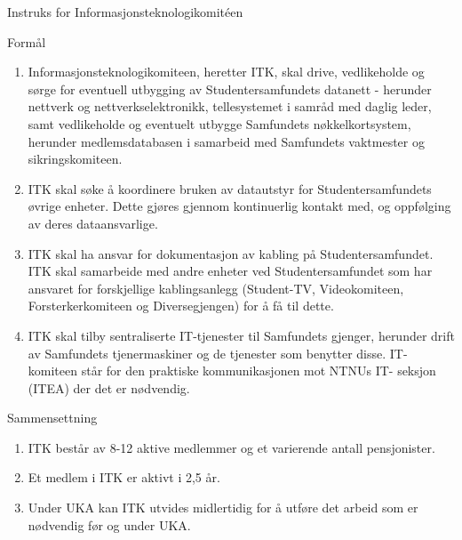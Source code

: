 \documentclass[../fsbok.tex]{subfiles}
\begin{document}
\begin{instruks*}{Instruks for Informasjonsteknologikomit\'een}

    \begin{instruksledd}{Formål}
        \begin{enumerate}
            \item Informasjonsteknologikomiteen, heretter ITK, skal drive, vedlikeholde og sørge for
                eventuell utbygging av
                Studentersamfundets datanett - herunder nettverk og nettverkselektronikk, tellesystemet i
                samråd med daglig
                leder, samt vedlikeholde og eventuelt utbygge Samfundets nøkkelkortsystem, herunder
                medlemsdatabasen i
                samarbeid med Samfundets vaktmester og sikringskomiteen.
            \item  ITK skal søke å koordinere bruken av datautstyr for Studentersamfundets øvrige
                enheter. Dette gjøres
                gjennom kontinuerlig kontakt med, og oppfølging av deres dataansvarlige.
            \item  ITK skal ha ansvar for dokumentasjon av kabling på Studentersamfundet. ITK skal
                samarbeide med andre
                enheter ved Studentersamfundet som har ansvaret for forskjellige kablingsanlegg
                (Student-TV, Videokomiteen, Forsterkerkomiteen og Diversegjengen) for å få til dette.
            \item  ITK skal tilby sentraliserte IT-tjenester til Samfundets gjenger, herunder drift av
                Samfundets tjenermaskiner
                og de tjenester som benytter disse. IT-komiteen står for den praktiske kommunikasjonen
                mot NTNUs IT-
                seksjon (ITEA) der det er nødvendig.
        \end{enumerate}
    \end{instruksledd}

    \begin{instruksledd}{Sammensettning}
        \begin{enumerate}
            \item ITK består av 8-12 aktive medlemmer og et varierende antall pensjonister.
            \item Et medlem i ITK er aktivt i 2,5 år.
            \item  Under UKA kan ITK utvides midlertidig for å utføre det arbeid som er nødvendig før og
            under UKA.
        \end{enumerate}
    \end{instruksledd}


\end{instruks*}
\end{document}
